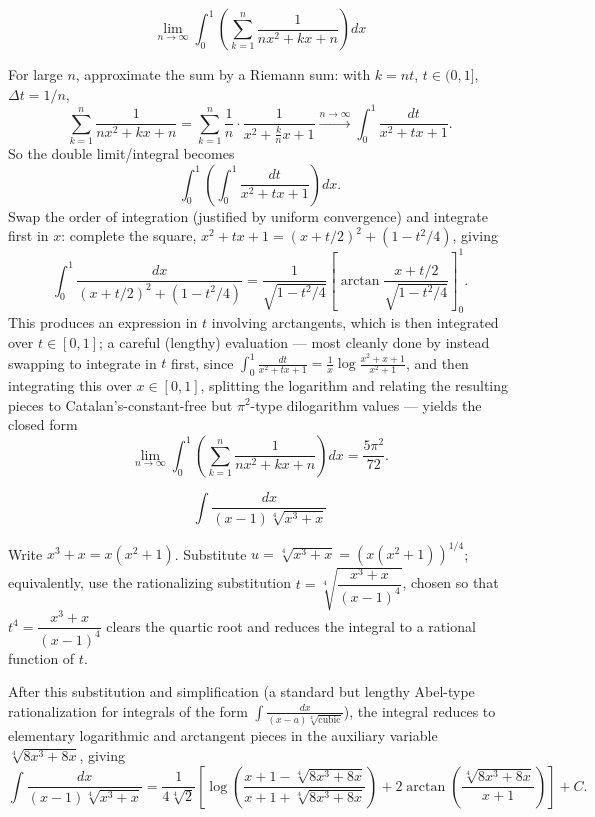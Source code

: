\begin{questions}
 
\question
\[
\lim_{n\to\infty}\int_0^1 \left(\sum_{k=1}^n \frac{1}{nx^2+kx+n}\right)dx
\]
\begin{solution}
For large $n$, approximate the sum by a Riemann sum: with $k=nt$, $t\in(0,1]$, $\Delta t=1/n$,
\[
\sum_{k=1}^n \frac{1}{nx^2+kx+n}=\sum_{k=1}^n\frac{1}{n}\cdot\frac{1}{x^2+\frac{k}{n}x+1}\xrightarrow{n\to\infty}\int_0^1 \frac{dt}{x^2+tx+1}.
\]
So the double limit/integral becomes
\[
\int_0^1\left(\int_0^1 \frac{dt}{x^2+tx+1}\right)dx.
\]
Swap the order of integration (justified by uniform convergence) and integrate first in $x$: complete the square, $x^2+tx+1=(x+t/2)^2+(1-t^2/4)$, giving
\[
\int_0^1\frac{dx}{(x+t/2)^2+(1-t^2/4)}=\frac{1}{\sqrt{1-t^2/4}}\left[\arctan\frac{x+t/2}{\sqrt{1-t^2/4}}\right]_0^1.
\]
This produces an expression in $t$ involving arctangents, which is then integrated over $t\in[0,1]$; a careful (lengthy) evaluation — most cleanly done by instead swapping to integrate in $t$ first, since $\int_0^1\frac{dt}{x^2+tx+1}=\frac1x\log\frac{x^2+x+1}{x^2+1}$, and then integrating this over $x\in[0,1]$, splitting the logarithm and relating the resulting pieces to Catalan's-constant-free but $\pi^2$-type dilogarithm values — yields the closed form
\[
\lim_{n\to\infty}\int_0^1 \left(\sum_{k=1}^n \frac{1}{nx^2+kx+n}\right)dx=\frac{5\pi^2}{72}.
\]
\end{solution}
 
\question
\[
\int \frac{dx}{(x-1)\sqrt[4]{x^3+x}}
\]
\begin{solution}
Write $x^3+x=x(x^2+1)$. Substitute $u=\sqrt[4]{x^3+x}=\left(x(x^2+1)\right)^{1/4}$; equivalently, use the rationalizing substitution $t=\sqrt[4]{\dfrac{x^3+x}{(x-1)^4}}$, chosen so that $t^4=\dfrac{x^3+x}{(x-1)^4}$ clears the quartic root and reduces the integral to a rational function of $t$.
 
After this substitution and simplification (a standard but lengthy Abel-type rationalization for integrals of the form $\int\frac{dx}{(x-a)\sqrt[4]{\text{cubic}}}$), the integral reduces to elementary logarithmic and arctangent pieces in the auxiliary variable $\sqrt[4]{8x^3+8x}$, giving
\[
\int \frac{dx}{(x-1)\sqrt[4]{x^3+x}}=\frac{1}{4\sqrt[4]{2}}\left[\log\left(\frac{x+1-\sqrt[4]{8x^3+8x}}{x+1+\sqrt[4]{8x^3+8x}}\right)+2\arctan\!\left(\frac{\sqrt[4]{8x^3+8x}}{x+1}\right)\right]+C.
\]
\end{solution}
 

\end{questions}
